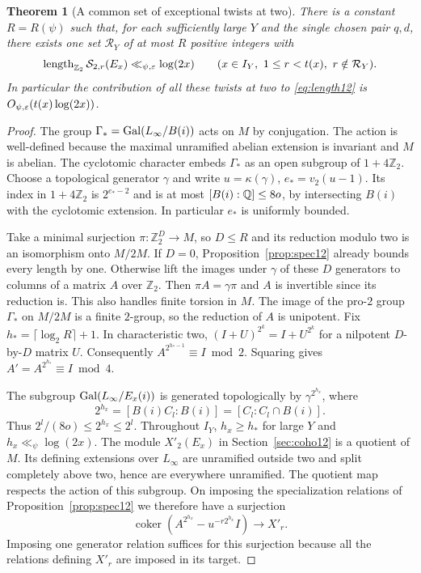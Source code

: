 \documentclass[a4paper,11pt]{article}
\newtheorem{theorem}[proposition]{Theorem}
\theoremstyle{definition}
\theoremstyle{remark}
\newcommand{\ZZ}{\mathbb Z}\newcommand{\ord}{\operatorname{ord}}
\newcommand{\len}{\operatorname{length}}\newcommand{\Res}{\operatorname*{Res}}
\numberwithin{equation}{section}
\begin{document}
\begin{theorem}[A common set of exceptional twists at two]\label{thm:exception15}
There is a constant \(R=R(\psi)\) such that, for each sufficiently large \(Y\) and the single chosen pair \(q,d\), there exists one set \(\mathcal R_Y\) of at most \(R\) positive integers with
\[
 \len_{\ZZ_2}\mathcal S_{2,r}(E_x)\ll_{\psi,\eps}\log(2x)
 \qquad (x\in I_Y,\ 1\le r<t(x),\ r\notin\mathcal R_Y).
\]
In particular the contribution of all these twists at two to \eqref{eq:length12} is \(O_{\psi,\varepsilon}(t(x)\log(2x))\).
\end{theorem}
\begin{proof}
The group \(\Gamma_*=\operatorname{Gal}(L_\infty/B(i))\) acts on \(M\) by conjugation. The action is well-defined because the maximal unramified abelian extension is invariant and \(M\) is abelian. The cyclotomic character embeds \(\Gamma_*\) as an open subgroup of \(1+4\ZZ_2\). Choose a topological generator \(\gamma\) and write \(u=\kappa(\gamma)\), \(e_*=v_2(u-1)\). Its index in \(1+4\ZZ_2\) is \(2^{e_*-2}\) and is at most \([B(i):\mathbb Q]\le8o\), by intersecting \(B(i)\) with the cyclotomic extension. In particular \(e_*\) is uniformly bounded.

Take a minimal surjection \(\pi:\ZZ_2^D\to M\), so \(D\le R\) and its reduction modulo two is an isomorphism onto \(M/2M\). If \(D=0\), Proposition~\ref{prop:spec12} already bounds every length by one. Otherwise lift the images under \(\gamma\) of these \(D\) generators to columns of a matrix \(A\) over \(\ZZ_2\). Then \(\pi A=\gamma\pi\) and \(A\) is invertible since its reduction is. This also handles finite torsion in \(M\). The image of the pro-\(2\) group \(\Gamma_*\) on \(M/2M\) is a finite \(2\)-group, so the reduction of \(A\) is unipotent. Fix \(h_*=\lceil\log_2 R\rceil+1\). In characteristic two, \((I+U)^{2^k}=I+U^{2^k}\) for a nilpotent \(D\)-by-\(D\) matrix \(U\). Consequently \(A^{2^{h_*-1}}\equiv I\bmod2\). Squaring gives \(A'=A^{2^{h_*}}\equiv I\bmod4\).

The subgroup \(\operatorname{Gal}(L_\infty/E_x(i))\) is generated topologically by \(\gamma^{2^{h_x}}\), where
\[
  2^{h_x}=[B(i)C_l:B(i)]=[C_l:C_l\cap B(i)].
\]
Thus \(2^l/(8o)\le2^{h_x}\le2^l\). Throughout \(I_Y\), \(h_x\ge h_*\) for large \(Y\) and \(h_x\ll_\psi\log(2x)\).
The module \(X'_2(E_x)\) in Section~\ref{sec:coho12} is a quotient of \(M\). Its defining extensions over \(L_\infty\) are unramified outside two and split completely above two, hence are everywhere unramified. The quotient map respects the action of this subgroup. On imposing the specialization relations of Proposition~\ref{prop:spec12} we therefore have a surjection
\[
  \operatorname{coker}\!\left(A^{2^{h_x}}-u^{-r2^{h_x}}I\right)
                    \longrightarrow X'_r .
\]
Imposing one generator relation suffices for this surjection because all the relations defining \(X'_r\) are imposed in its target.


\end{proof}
\end{document}
